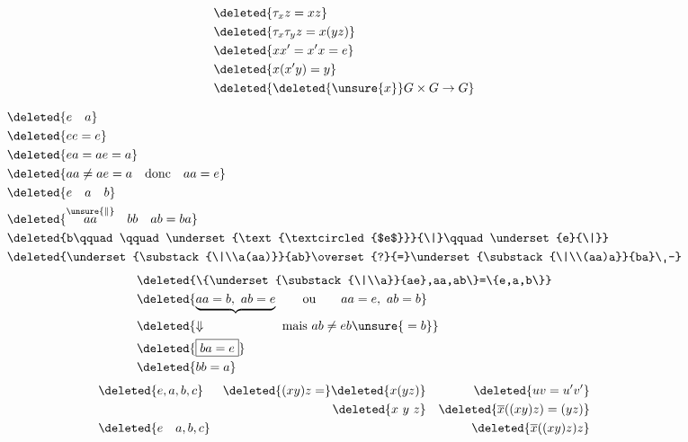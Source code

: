 \[
\begin{aligned}
&\deleted{\tau_x z=xz}\\
&\deleted{\tau_x\tau_y z=x(yz)}\\
&\deleted{xx'=x'x=e}\\
&\deleted{x(x'y)=y}\\
&\deleted{\deleted{\unsure{x}}G\times G\to G}
\end{aligned}
\]

\[
\begin{aligned}
&\deleted{e\quad a}\\
&\deleted{ee=e}\\
&\deleted{ea=ae=a}\\
&\deleted{aa\ne ae=a\quad\text{donc}\quad aa=e}\\
&\deleted{e\quad a\quad b}\\
&\deleted{\overset{\unsure{\|}}{aa}\quad bb\quad ab=ba}\\
&\deleted{b\qquad\qquad\underset{\text{\textcircled{$e$}}}{\|}\qquad\underset{e}{\|}}\\
&\deleted{\underset{\substack{\|\\a(aa)}}{ab}\overset{?}{=}\underset{\substack{\|\\(aa)a}}{ba}\ -}
\end{aligned}
\]
\[
\begin{aligned}
&\deleted{\{\underset{\substack{\|\\a}}{ae},aa,ab\}=\{e,a,b\}}\\
&\deleted{\underbrace{aa=b,\ ab=e}\qquad\text{ou}\qquad aa=e,\ ab=b}\\
&\deleted{\Downarrow\qquad\qquad\qquad\text{mais }ab\ne eb\unsure{{}=b}}\\
&\deleted{\boxed{ba=e}}\\
&\deleted{bb=a}
\end{aligned}
\]
\[
\begin{aligned}
&\deleted{e,a,b,c}&\deleted{(xy)z=}\deleted{x(yz)}&&\deleted{uv=u'v'}\\
&&\deleted{x\ y\ z}&&\deleted{\overline x((xy)z)=(yz)}\\
&\deleted{e\quad a,b,c}&&&\deleted{\overline x((xy)z)z}
\end{aligned}
\]

